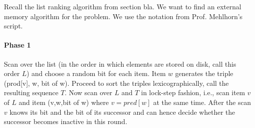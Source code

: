 Recall the list ranking algorithm from section bla. We want to find an external memory algorithm for the problem. We use the notation from Prof. Mehlhorn's script.

\paragraph{Phase 1} Scan over the list (in the order in which elements are stored on disk, call this order $L$) and choose a random bit for each item. Item $w$ generates the triple (prod[v], w, bit of w). Proceed to sort the triples lexicographically, call the resulting sequence $T$. Now scan over $L$ and $T$ in lock-step fashion, i.e., scan item $v$ of $L$ and item (v,w,bit of w) where $v=pred[w]$ at the same time. After the scan $v$ knows its bit and the bit of its successor and can hence decide whether the successor becomes inactive in this round.